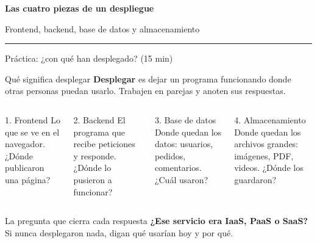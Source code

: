 \documentclass[aspectratio=169,10pt,c]{beamer}
\begin{document}
\begin{frame}[plain]
\vfill
\begin{center}
{\fontsize{29}{34}\selectfont\bfseries Las cuatro piezas de un despliegue}\par
\vspace{2mm}
{\small Frontend, backend, base de datos y almacenamiento}\par
\vspace{4mm}
{\color{utpRojo}\rule{8.5cm}{1.2pt}}
\end{center}
\vfill
\end{frame}

\begin{frame}{Práctica: ¿con qué han desplegado? \textnormal{\small(15 min)}}
\begin{block}{Qué significa desplegar}
\small \textbf{Desplegar} es dejar un programa funcionando donde otras personas puedan usarlo. Trabajen en parejas y anoten sus respuestas.
\end{block}
\begin{columns}[T,onlytextwidth]
\begin{exampleblock}{1. Frontend}
\small Lo que se ve en el navegador. ¿Dónde publicaron una página?
\end{exampleblock}
\begin{exampleblock}{2. Backend}
\small El programa que recibe peticiones y responde. ¿Dónde lo pusieron a funcionar?
\end{exampleblock}
\begin{exampleblock}{3. Base de datos}
\small Donde quedan los datos: usuarios, pedidos, comentarios. ¿Cuál usaron?
\end{exampleblock}
\begin{exampleblock}{4. Almacenamiento}
\small Donde quedan los archivos grandes: imágenes, PDF, videos. ¿Dónde los guardaron?
\end{exampleblock}
\end{columns}
\begin{alertblock}{La pregunta que cierra cada respuesta}
\small \textbf{¿Ese servicio era IaaS, PaaS o SaaS?} Si nunca desplegaron nada, digan qué usarían hoy y por qué.
\end{alertblock}
\end{frame}
\end{document}
